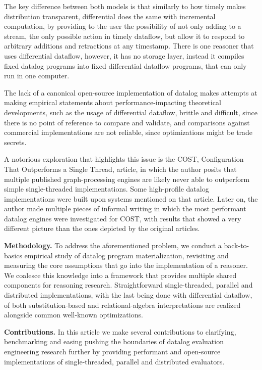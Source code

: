 \documentclass[manuscript,screen,review]{acmart}
\theoremstyle{definition}
\begin{document}
The key difference between both models is that similarly to how timely makes distribution
transparent, differential does the same with incremental computation, by providing to the user the
possibility of not only adding to a stream, the only possible action in timely dataflow, but
allow it to respond to arbitrary additions and retractions at any timestamp.  There is one
reasoner that uses differential dataflow\cite{ddlog}, however, it has no storage layer, instead
it compiles fixed datalog programs into fixed differential dataflow programs, that can only run in one computer.

The lack of a canonical open-source implementation of datalog makes attempts at making
empirical statements about performance-impacting theoretical developments, such as the usage of
differential dataflow, brittle and difficult, since there is no point of reference to
compare and validate, and comparisons against commercial implementations are not
reliable, since optimizations might be trade secrets.

A notorious exploration that highlights this issue is the COST, Configuration That Outperforms
a Single Thread, article\cite{COST}, in which the author posits that multiple published
graph-processing engines are likely never able to outperform simple single-threaded implementations.
Some high-profile datalog implementations were built upon systems mentioned on that article.
Later on, the author made multiple pieces of informal writing in which the most performant datalog
engines were investigated for COST\cite{blogdynamicdatalog, blogvldbsigmod}, with results that
showed a very different picture than the ones depicted by the original articles.

\textbf{Methodology.} To address the aforementioned problem, we conduct a back-to-basics
empirical study of datalog program materialization, revisiting and measuring the core assumptions
that go into the implementation of a reasoner. We coalesce this knowledge into a framework
that provides multiple shared components for reasoning research. Straightforward single-threaded,
parallel and distributed implementations, with the last being done with differential dataflow, of
both substitution-based and relational-algebra interpretations are realized alongside common
well-known optimizations.

\textbf{Contributions.} In this article we make several contributions to clarifying, benchmarking
and easing pushing the boundaries of datalog evaluation engineering research further by
providing performant and open-source implementations of single-threaded, parallel and distributed evaluators.
\end{document}
